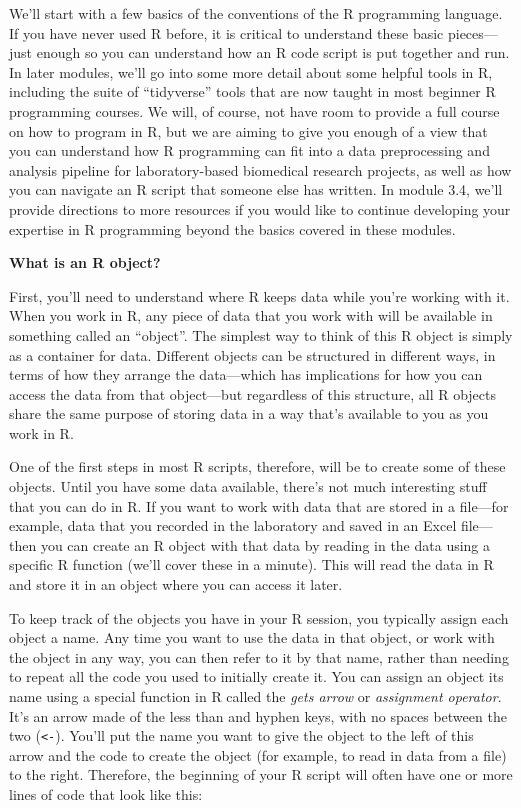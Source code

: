 \documentclass[]{tufte-book}
\begin{document}
We'll start with a few basics of the conventions of the R programming language.
If you have never used R before, it is critical to understand these basic
pieces---just enough so you can understand how an R code script is put together
and run. In later modules, we'll go into some more detail about some helpful
tools in R, including the suite of ``tidyverse''
tools that are now taught in most beginner R programming courses. We will, of
course, not have room to provide a full course on how to program in R, but we
are aiming to give you enough of a view that you can understand how R
programming can fit into a data preprocessing and analysis pipeline for
laboratory-based biomedical research projects, as well as how you can navigate
an R script that someone else has written. In module 3.4, we'll provide
directions to more resources if you would like to continue developing your
expertise in R programming beyond the basics covered in these modules.

\textbf{What is an R object?}

First, you'll need to understand where R keeps data while you're working with
it. When you work in R, any piece of data that you work with will be available
in something called an ``object''. The simplest way to think of this R object is
simply as a container for data. Different objects can be structured in different
ways, in terms of how they arrange the data---which has implications for how
you can access the data from that object---but regardless of this structure, all
R objects share the same purpose of storing data in a way that's available to
you as you work in R.

One of the first steps in most R scripts, therefore, will be to create some of
these objects. Until you have some data available, there's not much interesting
stuff that you can do in R. If you want to work with data that are stored in a
file---for example, data that you recorded in the laboratory and saved in an
Excel file---then you can create an R object with that data by reading in the
data using a specific R function (we'll cover these in a minute). This will read
the data in R and store it in an object where you can access it later.

To keep track of the objects you have in your R session, you typically assign
each object a name. Any time you want to use the data in that object, or work
with the object in any way, you can then refer to it by that name, rather than
needing to repeat all the code you used to initially create it. You can assign
an object its name using a special function in R called the \emph{gets arrow} or
\emph{assignment operator}. It's an arrow made of the less than and hyphen keys, with
no spaces between the two (\texttt{\textless{}-}). You'll put the name you want to give the object
to the left of this arrow and the code to create the object (for example, to read
in data from a file) to the right. Therefore, the beginning of your R script
will often have one or more lines of code that look like this:
\end{document}
